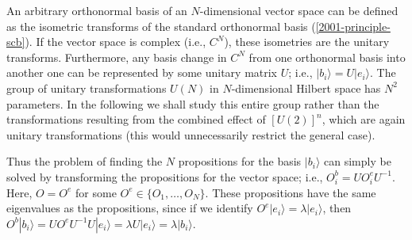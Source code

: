 An arbitrary orthonormal basis of an $N$-dimensional vector space can be defined
as the isometric transforms  of the standard orthonormal basis (\ref{2001-principle-scb}).
If the vector space is complex (i.e., $C^N$),
these isometries are the unitary transforms.
Furthermore, any basis change in $C^N$ from one orthonormal basis into another one
can be represented by
some unitary matrix $U$; i.e., $|b_i\rangle=U |e_i\rangle $.
The group of unitary transformations $U(N)$ in $N$-dimensional
Hilbert space has $N^2$ parameters.
In the following we shall study this entire group rather than the transformations resulting
from the combined effect of $[U(2)]^n$, which are again unitary transformations
(this would unnecessarily restrict the general case).

Thus the problem of finding the $N$ propositions for the basis $|b_i\rangle$
can simply be solved by transforming the propositions for the vector space; i.e.,
$
O^b_i=U O^e_i U^{-1}
$.
Here, $O =O^e$ for some $O^e\in \{O_1,\ldots ,O_N\}$.
These propositions have the same eigenvalues as the  propositions, since if we identify
$O^e |e_i\rangle = \lambda |e_i \rangle $, then
$
O^b |b_i \rangle = U O^e U^{-1} U |e_i \rangle = \lambda U |e_i \rangle = \lambda |b_i \rangle
$.





